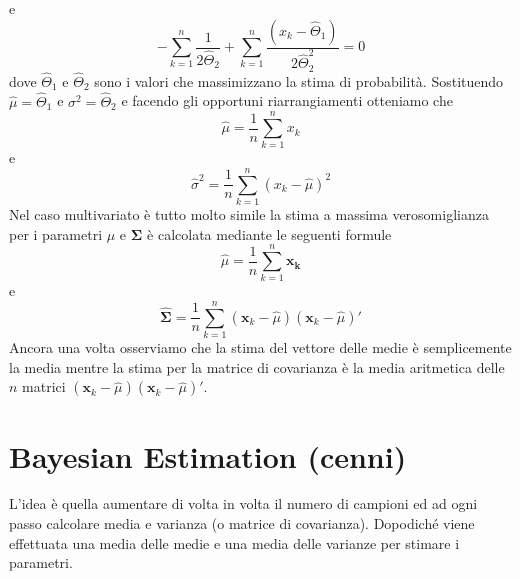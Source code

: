 e
\begin{equation}
- \sum_{k=1}^n \frac{1}{2 \hat{\Theta}_2} + \sum_{k=1}^n \frac{(x_k - \hat{\Theta}_1)}{2 \hat{\Theta}_2^2} = 0
\end{equation}
dove $\hat{\Theta}_1$ e $\hat{\Theta}_2$ sono i valori che massimizzano la stima di probabilità. Sostituendo $\hat{\mu} = \hat{\Theta}_1$ e $\sigma^2 = \hat{\Theta}_2$ e facendo gli opportuni riarrangiamenti otteniamo che 
\begin{equation}
\hat{\mu} = \frac{1}{n} \sum_{k=1}^n x_k
\end{equation}
e
\begin{equation}
\hat{\sigma}^2 = \frac{1}{n} \sum_{k=1}^n (x_k- \hat{\mu})^2
\end{equation}
Nel caso multivariato è tutto molto simile la stima a massima verosomiglianza per i parametri $\mu$ e $\mathbf{\Sigma}$ è calcolata mediante le seguenti formule
\begin{equation}
\hat{\mu} = \frac{1}{n} \sum_{k=1}^n \mathbf{x_k}
\end{equation}
e
\begin{equation}
\hat{\mathbf{\Sigma}} = \frac{1}{n} \sum_{k=1}^n (\mathbf{x}_k - \hat{\mu})(\mathbf{x}_k - \hat{\mu})'
\end{equation}
Ancora una volta osserviamo che la stima del vettore delle medie è semplicemente la media mentre la stima per la matrice di covarianza è la media aritmetica delle $n$ matrici $(\mathbf{x}_k - \hat{\mu})(\mathbf{x}_k - \hat{\mu})'$. 

\section{Bayesian Estimation (cenni)} 
L'idea è quella aumentare di volta in volta il numero di campioni ed ad ogni passo calcolare media e varianza (o matrice di covarianza). Dopodiché viene effettuata una media delle medie e una media delle varianze per stimare i parametri.

